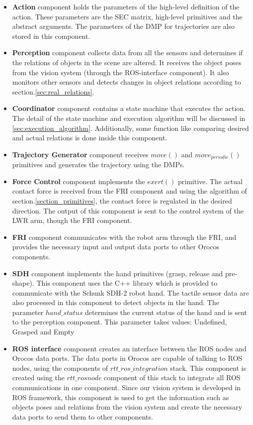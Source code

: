 \begin{itemize}
 \item{\textbf{Action}}
component holds the parameters of the high-level definition of the action.
These parameters are the SEC matrix, high-level primitives and the abstract arguments.
The parameters of the DMP for trajectories are also stored in this component.
\item{\textbf{Perception}}
component collects data from all the sensors and determines if the relations of objects in the scene are altered.
It receives the object poses from the vision system (through the ROS-interface component).
It also monitors other sensors and detects changes in object relations according to section.\ref{sec:real_relations}.
\item{\textbf{Coordinator}}
component contains a state machine that executes the action.
The detail of the state machine and execution algorithm will be discussed in \ref{sec:execution_algorithm}.
Additionally, some function like comparing desired and actual relations is done inside this component.

\item{\textbf{Trajectory Generator}}
component receives $move()$ and $move_{periodic}()$ primitives and generates the trajectory using the DMPs.

\item{\textbf{Force Control}}
component implements the $exert()$ primitive.
The actual contact force is received from the FRI component and using the algorithm of section.\ref{section_primitives},
the contact force is regulated in the desired direction.
The output of this component is sent to the control system of the LWR arm, though the FRI component.

\item{\textbf{FRI}}
component communicates with the robot arm through the FRI,
and provides the necessary input and output data ports to other Orocos components.

\item{\textbf{SDH}}
component implements the hand primitives (grasp, release and pre-shape).
This component uses the C++ library which is provided to communicate with the Schunk SDH-2 robot hand.
The tactile sensor data are also processed in this component to detect objects in the hand.
The parameter $hand\_status$ determines the current status of the hand and is sent to the perception component.
This parameter takes values: Undefined, Grasped and Empty

\item{\textbf{ROS interface}}
component creates an interface between the ROS nodes and Orocos data ports.
The data ports in Orocos are capable of talking to ROS nodes, using the components of $rtt\_ros\_integration$ stack.
This component is created using the $rtt\_rosnode$ component of this stack to integrate all ROS communications in one component.
Since our vision system is developed in ROS framework, this component is used to get the information such as 
objects poses and relations from the vision system and create the necessary data ports to send them to other components.
\end{itemize}



